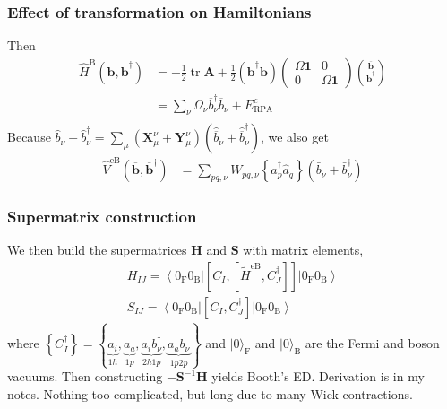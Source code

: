 \documentclass{beamer}
\begin{document}
\begin{frame}
    \frametitle{Effect of transformation on Hamiltonians}
Then
\begin{align}
    \hat{H}^{\mathrm{B}}\left(\overline{\mathbf{b}},
\overline{\mathbf{b}}^{\dagger}\right)&=-\frac{1}{2} \operatorname{tr} \mathbf{A}+\frac{1}{2}\left(\overline{\mathbf{b}}^{\dagger} \overline{\mathbf{b}}\right)\left(\begin{array}{cc}\Omega \mathbf{1} & 0 \\
0 & \Omega \mathbf{1}
\end{array}\right)\binom{\overline{\mathbf{b}}}{\overline{\mathbf{b}}^{\dagger}} \\
&=\sum_{\nu} \Omega_\nu \overline{b}_\nu^{\dagger} \overline{b}_\nu + E_{\mathrm{RPA}}^c \\
\end{align}
Because $\hat{b}_\nu + \hat{b}_{\nu}^\dagger = \sum_\mu \left(\mathbf{X}_{\mu}^{\nu} + \mathbf{Y}_{\mu}^{\nu}\right) \left(\hat{\overline{b}}_\nu + \hat{\overline{b}}_\nu^\dagger\right)$, we also get
\begin{align}
\hat{V}^{\mathrm{eB}}\left(\overline{\mathbf{b}},
\overline{\mathbf{b}}^{\dagger}\right)
&= \sum_{p q, \nu} W_{p q, \nu} \left\{ \hat{a}_p^{\dagger} \hat{a}_q \right\}\left(\bar{b}_\nu+\bar{b}_\nu^{\dagger}\right)
\end{align}
\end{frame}
\begin{frame}
    \frametitle{Supermatrix construction}
We then build the supermatrices $\mathbf{H}$ and $\mathbf{S}$ with matrix elements,
$$
\begin{gathered}
H_{I J}=\left\langle 0_{\mathrm{F}} 0_{\mathrm{B}}\right|\left[C_I,\left[\tilde{H}^{\mathrm{eB}}, C_J^{\dagger}\right]\right]\left|0_{\mathrm{F}} 0_{\mathrm{B}}\right\rangle \\
S_{I J}=\left\langle 0_{\mathrm{F}} 0_{\mathrm{B}}\right|\left[C_I, C_J^{\dagger}\right]\left|0_{\mathrm{F}} 0_{\mathrm{B}}\right\rangle
\end{gathered}
$$
where $\left\{C_I^{\dagger}\right\}=\left\{\underbrace{a_i}_{1h}, \underbrace{a_a}_{1p}, \underbrace{a_i b_\nu^{\dagger}}_{2h1p}, \underbrace{a_a b_\nu}_{1p2p}\right\}$ and $|0\rangle_{\mathrm{F}}$ and $|0\rangle_{\mathrm{B}}$ are the Fermi and boson vacuums. Then constructing $-\bm{S}^{-1}\bm{H}$ yields Booth's ED. Derivation is in my notes. Nothing too complicated, but long due to many Wick contractions.
\end{frame}
\end{document}
